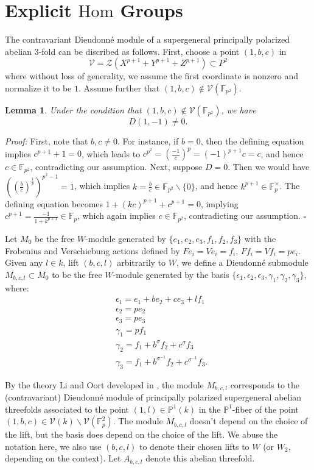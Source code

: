\documentclass[a4paper,12pt,twoside]{report}
\newtheorem{lemma}[theorem]{Lemma}
\newcommand{\F}{\mathbb{F}}
\newcommand{\Hom}{\mathrm{Hom}}
\begin{document}
\section{Explicit $\Hom$ Groups}

The contravariant Dieudonn\'e module of a supergeneral principally polarized abelian $3$-fold can be discribed as follows. 
First, choose a point $(1,b,c)$ in \[\mathcal{V}=\mathcal{Z}(X^{p+1}+Y^{p+1}+Z^{p+1})\subset P^2\]
where without loss of generality, we assume the first coordinate is nonzero and normalize it to be $1$. 
Assume further that $(1,b,c)\notin \mathcal{V}(\F_{p^2})$. 

\begin{lemma}
    Under the condition that $(1,b,c)\notin \mathcal{V}(\F_{p^2})$, 
    we have \[D(1,-1)\neq 0.\]
\end{lemma}

\noindent\emph{Proof:} First, note that $b,c\neq 0$. For instance, if $b=0$, then the defining equation 
implies $c^{p+1}+1=0$, which leads to $c^{p^2}=(\frac{-1}{c})^p=(-1)^{p+1}c=c$, and hence $c\in \F_{p^2}$, 
contradicting our assumption. 
Next, suppose $D=0$. Then we would have $((\frac{b}{c})^{\frac{1}{p}})^{p^2-1}=1$, 
which implies $k=\frac{b}{c}\in \F_{p^2}\backslash\{0\}$, and hence $k^{p+1}\in \F_p^\times$.
The defining equation becomes $1+(kc)^{p+1}+c^{p+1}=0$, implying $c^{p+1}=\frac{-1}{1+k^{p+1}}\in \F_p$, 
which again implies $c\in \F_{p^2}$, contradicting our assumption. $\square$

Let $M_0$ be the free $W$-module generated by $\{e_1,e_2,e_3,f_1,f_2,f_3\}$ 
with the Frobenius and Verschiebung actions defined by $Fe_i=Ve_i=f_i$, $Ff_i=Vf_i=pe_i$. 
Given any $l\in k$, lift $(b,c,l)$ arbitrarily to $W$, we define a Dieudonn\'e submodule $M_{b,c,l}\subset M_0$ 
to be the free $W$-module generated by the basis $\{\epsilon_1,\epsilon_2,\epsilon_3,\gamma_1,\gamma_2,\gamma_3\}$, 
where: 
\[\begin{aligned}
    &\epsilon_1=e_1+be_2+ce_3+lf_1\\
    &\epsilon_2=pe_2\\
    &\epsilon_3=pe_3\\
    &\gamma_1=pf_1\\
    &\gamma_2=f_1+b^{\sigma}f_2+c^{\sigma}f_3\\
    &\gamma_3=f_1+b^{\sigma^{-1}}f_2+c^{\sigma^{-1}}f_3.
\end{aligned}\]

By the theory Li and Oort developed in \cite{LiOo}, the module $M_{b,c,l}$ corresponds to the (contravariant) 
Dieudonn\'e module of principally polarized supergeneral abelian threefolds associated to the 
point $(1,l)\in \mathbb{P}^1(k)$ in the $\mathbb{P}^1$-fiber of the point 
$(1,b,c)\in \mathcal{V}(k)\backslash \mathcal{V}(\F_p^2)$. 
The module $M_{b,c,l}$ doesn't depend on the choice of the lift, 
but the basis does depend on the choice of the lift. 
We abuse the notation here, we also use $(b,c,l)$ to denote their chosen lifts to $W$ 
(or $W_2$, depending on the context). 
Let $A_{b,c,l}$ denote this abelian threefold.  
\end{document}

